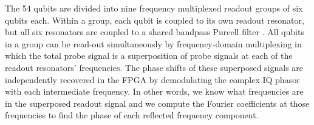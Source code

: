 The 54 qubits are divided into nine frequency multiplexed readout groups of six qubits each.
Within a group, each qubit is coupled to its own readout resonator, but all six resonators are coupled to a shared bandpass Purcell filter \cite{Reed2010Purcell, Sete2015Purcell, Jeffrey2014Fast}.
All qubits in a group can be read-out simultaneously by frequency-domain multiplexing \cite{chen2012mux, barends2014nine} in which the total probe signal is a superposition of probe signals at each of the readout resonators’ frequencies.
The phase shifts of these superposed signals are independently recovered in the FPGA by demodulating the complex IQ phasor with each intermediate frequency.
In other words, we know what frequencies are in the superposed readout signal and we compute the Fourier coefficients at those frequencies to find the phase of each reflected frequency component.
